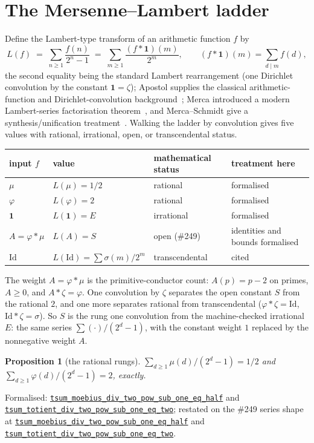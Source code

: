 \documentclass[11pt]{article}
\newcommand{\commit}{81150c1c6fdd4cd51e76d3aa0de344341e0e9e7c}
\newcommand{\repobase}{https://github.com/wcook04/plectis-lean-erdos249-257/blob/\commit}
\newcommand{\PK}{Erdos249257}
\newcommand{\lref}[3]{\href{\repobase/\PK/#1\#L#2}{\nolinkurl{#3}}}
\newcommand{\lrefx}[3]{\href{\repobase/\PK/#1\#L#2}{\nolinkurl{#3}}}
\newtheorem{proposition}[theorem]{Proposition}
\theoremstyle{definition}
\theoremstyle{remark}
\newcommand{\ph}{\varphi}
\begin{document}
\section{The Mersenne--Lambert ladder}\label{sec:ladder}

Define the Lambert-type transform of an arithmetic function $f$ by
\[
L(f)\;=\;\sum_{n\ge1}\frac{f(n)}{2^n-1}\;=\;\sum_{m\ge1}\frac{(f*\mathbf 1)(m)}{2^m},
\qquad (f*\mathbf 1)(m)=\sum_{d\mid m} f(d),
\]
the second equality being the standard Lambert rearrangement (one Dirichlet
convolution by the constant $\mathbf 1=\zeta$); Apostol supplies the classical
arithmetic-function and Dirichlet-convolution background~\cite{apostol}; Merca
introduced a modern Lambert-series factorisation theorem~\cite{merca2017}, and
Merca--Schmidt give a synthesis/unification treatment~\cite{mercaschmidt}.
Walking the ladder by convolution gives five values with
rational, irrational, open, or transcendental status.

\begin{center}
\begin{tabular}{@{}llll@{}}
\toprule
input $f$ & value & mathematical status & treatment here\\
\midrule
$\mu$ & $L(\mu)=1/2$ & rational & formalised\\
$\ph$ & $L(\ph)=2$ & rational & formalised\\
$\mathbf 1$ & $L(\mathbf 1)=E$ & irrational & formalised\\
$A=\ph*\mu$ & $L(A)=S$ & open (\#249) & identities and bounds formalised\\
$\mathrm{Id}$ & $L(\mathrm{Id})=\sum\sigma(m)/2^m$ & transcendental & cited~\cite{nesterenko}\\
\bottomrule
\end{tabular}
\end{center}

The weight $A=\ph*\mu$ is the primitive-conductor count: $A(p)=p-2$ on primes,
$A\ge0$, and $A*\zeta=\ph$. One convolution by $\zeta$ separates the open
constant $S$ from the rational $2$, and one more separates rational from
transcendental ($\ph*\zeta=\mathrm{Id}$, $\mathrm{Id}*\zeta=\sigma$). So $S$ is
the rung one convolution from the machine-checked irrational $E$: the same series
$\sum(\cdot)/(2^d-1)$, with the constant weight $1$ replaced by the nonnegative
weight $A$.

\begin{proposition}[the rational rungs]
$\sum_{d\ge1}\mu(d)/(2^d-1)=1/2$ and $\sum_{d\ge1}\ph(d)/(2^d-1)=2$, exactly.
\end{proposition}
\noindent Formalised: \lref{MersenneLambertLadder.lean}{587}{tsum_moebius_div_two_pow_sub_one_eq_half}
and \lref{MersenneLambertLadder.lean}{575}{tsum_totient_div_two_pow_sub_one_eq_two}; restated on the
\#249 series shape at \lrefx{CertificateKernel.lean}{18106}{tsum_moebius_div_two_pow_sub_one_eq_half}
and \lrefx{CertificateKernel.lean}{18101}{tsum_totient_div_two_pow_sub_one_eq_two}.
\end{document}
